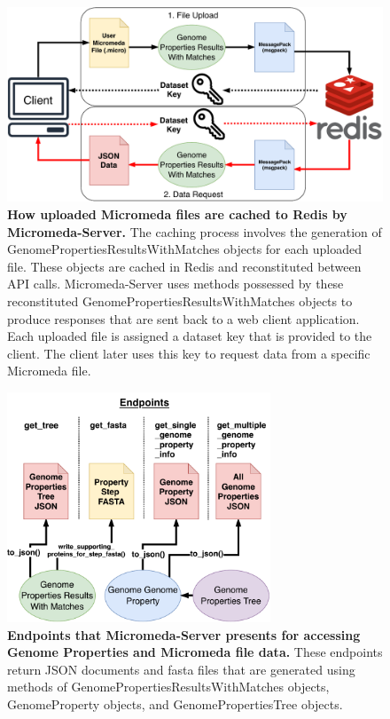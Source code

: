 \begin{figure}[!ht]
  \centering
	\includegraphics[width=\textwidth]{media/Micromeda-Server-Workflow.pdf}
	 \caption[How uploaded Micromeda files are cached to Redis by 
Micromeda-Server.]{\textbf{How uploaded Micromeda files are cached to Redis by 
Micromeda-Server.} The caching process involves the generation of 
GenomePropertiesResultsWithMatches objects for each uploaded file. These objects 
are cached in Redis and reconstituted between API calls. Micromeda-Server uses 
methods possessed by these reconstituted GenomePropertiesResultsWithMatches 
objects to produce responses that are sent back to a web client application. 
Each uploaded file is assigned a dataset key that is provided to the client. The 
client later uses this key to request data from a specific Micromeda file.}
	 \label{fig:micromeda-server-workflow}
\end{figure}

\begin{figure}[!ht]
  \centering
	\includegraphics[width=0.7\textwidth]{media/Micromeda-Endpoints.pdf}
	 \caption[Endpoints that Micromeda-Server presents for accessing Genome 
Properties and Micromeda file data.]{\textbf{Endpoints that Micromeda-Server 
presents for accessing Genome Properties and Micromeda file data.} These 
endpoints return JSON documents and \gls{fasta} files that are generated using 
methods of GenomePropertiesResultsWithMatches objects, GenomeProperty objects, 
and GenomePropertiesTree objects.}
	 \label{fig:micromeda-endpoints}
\end{figure}

